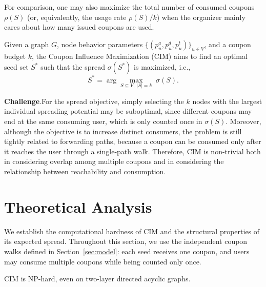 \documentclass[sigconf]{acmart}
\begin{document}
\textcolor[rgb]{1.00,0.00,0.00}{For comparison, one may also maximize the total number of consumed coupons $\rho(S)$ (or, equivalently, the usage rate $\rho(S)/k$) when the organizer mainly cares about how many issued coupons are used.}



\begin{definition}
\label{def:cim}
Given a graph $G$, node behavior parameters $\{(p_u^a,p_u^d,p_u^t)\}_{u\in V}$, and a coupon budget $k$, the Coupon Influence Maximization (CIM) aims to find an optimal seed set $S^*$ such that the spread $\sigma(S^*)$ is maximized, i.e.,
\begin{equation}
S^{*} = \arg\max_{S \subseteq V,\ |S|=k}\; \sigma(S).
\end{equation}
\end{definition}
\textbf{Challenge}.For the spread objective, simply selecting the $k$ nodes with the largest individual spreading potential may be suboptimal, since different coupons may end at the same consuming user, which is only counted once in $\sigma(S)$. Moreover, although the objective is to increase distinct consumers, the problem is still tightly related to forwarding paths, because a coupon can be consumed only after it reaches the user through a single-path walk. Therefore, CIM is non-trivial both in considering overlap among multiple coupons and in considering the relationship between reachability and consumption.



\section{Theoretical Analysis}
\label{sec:theory}

We establish the computational hardness of CIM and the structural
properties of its expected spread. Throughout this section, we use the
independent coupon walks defined in Section~\ref{sec:model}: each seed
receives one coupon, and users may consume multiple coupons while being
counted only once.

\begin{theorem}
\label{thm:nphard}
CIM is NP-hard, even on two-layer directed acyclic graphs.
\end{theorem}
\end{document}
